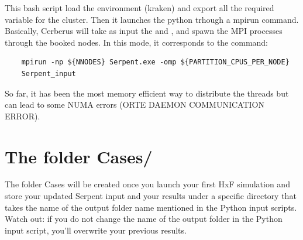 \documentclass{article}
\begin{document}
This bash script load the environment (kraken) and export all the required variable for the cluster. Then it launches the python trhough a mpirun command. Basically, Cerberus will take as input the  and , and spawn the MPI processes through the booked nodes. In this mode, it corresponds to the command:
\begin{verbatim}
    mpirun -np ${NNODES} Serpent.exe -omp ${PARTITION_CPUS_PER_NODE} 
    Serpent_input 
\end{verbatim}
So far, it has been the most memory efficient way to distribute the threads but can lead to some NUMA errors (ORTE DAEMON COMMUNICATION ERROR). 

\newpage
\section{The folder \textbf{Cases/}}\label{sec:cases}

The folder Cases will be created once you launch your first HxF simulation and store your updated Serpent input and your results under a specific directory that takes the name of the output folder name mentioned in the Python input scripts. Watch out: if you do not change the name of the output folder in the Python input script, you'll overwrite your previous results.
\end{document}
